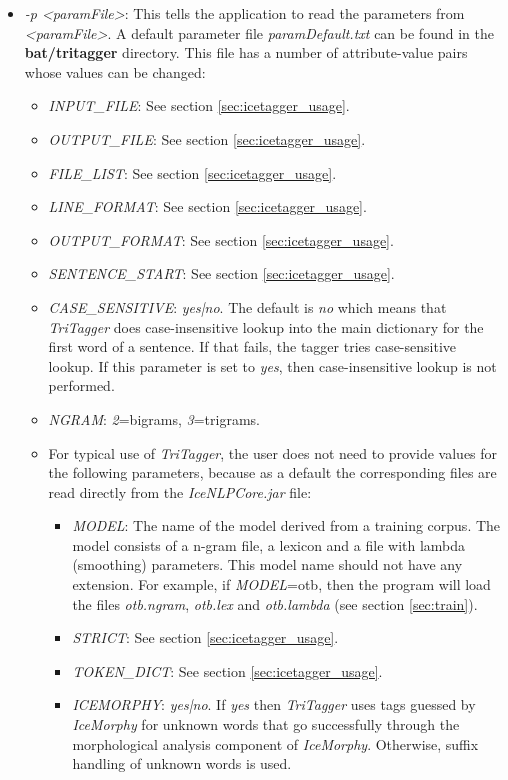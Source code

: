 \documentclass[11pt]{article}
\begin{document}
\begin{itemize}
\item \emph{-p <paramFile>}: This tells the application to read the parameters from \emph{<paramFile>}. A default parameter file \emph{paramDefault.txt} can be found in the \textbf{bat/tritagger} directory.
This file has a number of attribute-value pairs whose values can be changed:

\begin{itemize}
\item \emph{INPUT\_FILE}: See section \ref{sec:icetagger_usage}.
\item \emph{OUTPUT\_FILE}: See section \ref{sec:icetagger_usage}.
\item \emph{FILE\_LIST}: See section \ref{sec:icetagger_usage}.
\item \emph{LINE\_FORMAT}: See section \ref{sec:icetagger_usage}.
\item \emph{OUTPUT\_FORMAT}: See section \ref{sec:icetagger_usage}.
\item \emph{SENTENCE\_START}: See section \ref{sec:icetagger_usage}.
\item \emph{CASE\_SENSITIVE}: \emph{yes|no}. The default is \emph{no} which means that \emph{TriTagger} does case-insensitive lookup into the main dictionary for the first word of a sentence. If that fails, the tagger tries case-sensitive lookup. If this parameter is set to \emph{yes}, then case-insensitive lookup is not performed. 
\item \emph{NGRAM}: \emph{2}=bigrams, \emph{3}=trigrams.
\item For typical use of \textit{TriTagger}, the user does not need to provide values for the following parameters, because as a default the corresponding files are read directly from the \emph{IceNLPCore.jar} file:
\begin{itemize}
\item \emph{MODEL}: The name of the model derived from a training corpus. The model consists of a n-gram file, a lexicon and a file with lambda (smoothing) parameters. This model name should not have any extension. For example, if \emph{MODEL}=otb, then the program will load the files \emph{otb.ngram}, \emph{otb.lex} and \emph{otb.lambda} (see section \ref{sec:train}).
\item \emph{STRICT}: See section \ref{sec:icetagger_usage}.
\item \emph{TOKEN\_DICT}: See section \ref{sec:icetagger_usage}.
\item \emph{ICEMORPHY}: \emph{yes|no}. If \emph{yes} then \emph{TriTagger} uses tags guessed by \emph{IceMorphy} for unknown words that go successfully through the morphological analysis component of \emph{IceMorphy}. Otherwise, suffix handling of unknown words is used.

\end{itemize}
\end{itemize}
\end{itemize}
\end{document}
